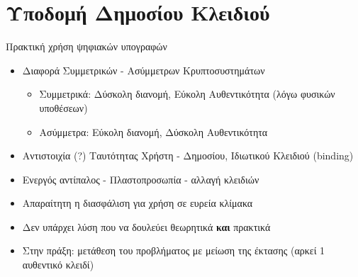 \documentclass[handout]{beamer}
\begin{document}
\section{Υποδομή Δημοσίου Κλειδιού}

\begin{frame}{Πρακτική χρήση ψηφιακών υπογραφών}
     \begin{itemize}
        \item Διαφορά Συμμετρικών - Ασύμμετρων Κρυπτοσυστημάτων
        \begin{itemize}
            \item Συμμετρικά: Δύσκολη διανομή, Εύκολη Αυθεντικότητα (λόγω φυσικών υποθέσεων)
            \item Ασύμμετρα: Εύκολη διανομή, Δύσκολη Αυθεντικότητα
        \end{itemize}
        \item Αντιστοιχία  (?) Ταυτότητας Χρήστη - Δημοσίου, Ιδιωτικού Κλειδιού (binding)
        \pause
        \item Ενεργός αντίπαλος - Πλαστοπροσωπία - αλλαγή κλειδιών
        \pause
        \item Απαραίτητη η διασφάλιση για χρήση σε ευρεία κλίμακα
        \pause
        \item \alert{Δεν υπάρχει λύση} που να δουλεύει θεωρητικά \textbf{και} πρακτικά
        \pause 
        \item Στην πράξη: μετάθεση του προβλήματος με μείωση της έκτασης (αρκεί 1 αυθεντικό κλειδί)
    \end{itemize}
\end{frame}
\end{document}
